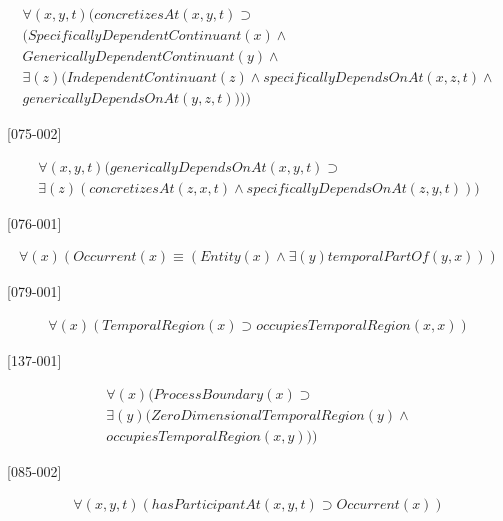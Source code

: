 \documentclass{article}
\begin{document}
\begin{flushright}
[073-001] 

\begin{equation}
\begin{split}
{\forall}(x, y, t)(concretizesAt(x, y, t) \supset \\
(SpecificallyDependentContinuant(x) \wedge \\
GenericallyDependentContinuant(y) \wedge \\
{\exists}(z)(IndependentContinuant(z) \wedge specificallyDependsOnAt(x, z, t) \wedge \\
genericallyDependsOnAt(y, z, t))))
\end{split}
\end{equation}

[075-002] 

\begin{equation}
\begin{split}
{\forall}(x, y, t)(genericallyDependsOnAt(x, y, t) \supset \\
{\exists}(z)(concretizesAt(z, x, t) \wedge specificallyDependsOnAt(z, y, t)))
\end{split}
\end{equation}

[076-001] 

\begin{equation}
\begin{split}
{\forall}(x)(Occurrent(x) \equiv (Entity(x) \wedge {\exists}(y)temporalPartOf(y, x)))
\end{split}
\end{equation}

[079-001] 

\begin{equation}
\begin{split}
{\forall}(x)(TemporalRegion(x) \supset occupiesTemporalRegion(x, x))
\end{split}
\end{equation}

[137-001] 

\begin{equation}
\begin{split}
{\forall}(x)(ProcessBoundary(x) \supset \\
{\exists}(y)(ZeroDimensionalTemporalRegion(y) \wedge \\
occupiesTemporalRegion(x, y)))
\end{split}
\end{equation}

[085-002] 

\begin{equation}
\begin{split}
{\forall}(x, y, t)(hasParticipantAt(x, y, t) \supset Occurrent(x))
\end{split}
\end{equation}


\end{flushright}
\end{document}
